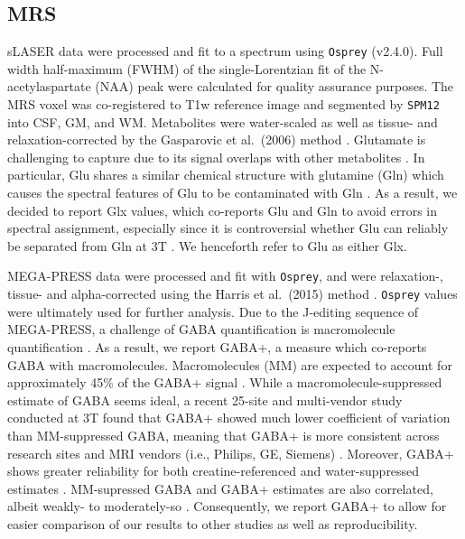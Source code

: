 \documentclass[
true
]{sn-jnl}
\begin{document}
\subsection{MRS}\label{mrs}

sLASER data were processed and fit to a spectrum using \texttt{Osprey}
\citep{oeltzschnerOspreyOpenSourceProcessing2020} (v2.4.0). Full width
half-maximum (FWHM) of the single-Lorentzian fit of the
N-acetylaspartate (NAA) peak were calculated for quality assurance
purposes. The MRS voxel was co-registered to T1w reference image and
segmented by \texttt{SPM12}
\citep{fristonStatisticalParametricMapping2007} into CSF, GM, and WM.
Metabolites were water-scaled as well as tissue- and
relaxation-corrected by the Gasparovic et al.~(2006) method
\citep{gasparovicUseTissueWater2006}. Glutamate is challenging to
capture due to its signal overlaps with other metabolites
\citep{pasantaFunctionalMRSStudies2023}. In particular, Glu shares a
similar chemical structure with glutamine (Gln) which causes the
spectral features of Glu to be contaminated with Gln
\citep{ramadanGlutamateGlutamineReview2013}. As a result, we decided to
report Glx values, which co-reports Glu and Gln to avoid errors in
spectral assignment, especially since it is controversial whether Glu
can reliably be separated from Gln at 3T
\citep{pasantaFunctionalMRSStudies2023, ramadanGlutamateGlutamineReview2013}.
We henceforth refer to Glu as either Glx.

MEGA-PRESS data were processed and fit with \texttt{Osprey}, and were
relaxation-, tissue- and alpha-corrected using the Harris et al.~(2015)
method \citep{harrisSpectralEditingMeasurementsGABA2015}.
\texttt{Osprey} values were ultimately used for further analysis. Due to
the J-editing sequence of MEGA-PRESS, a challenge of GABA quantification
is macromolecule quantification
\citep{harrisSpectralEditingMeasurementsGABA2015}. As a result, we
report GABA+, a measure which co-reports GABA with macromolecules.
Macromolecules (MM) are expected to account for approximately 45\% of
the GABA+ signal \citep{harrisSpectralEditingMeasurementsGABA2015}.
While a macromolecule-suppressed estimate of GABA seems ideal, a recent
25-site and multi-vendor study conducted at 3T found that GABA+ showed
much lower coefficient of variation than MM-suppressed GABA, meaning
that GABA+ is more consistent across research sites and MRI vendors
(i.e., Philips, GE, Siemens) \citep{mikkelsenBigGABAII2019}. Moreover,
GABA+ shows greater reliability for both creatine-referenced and
water-suppressed estimates
\citep{mikkelsenBigGABAEdited2017, mikkelsenBigGABAII2019}. MM-supressed
GABA and GABA+ estimates are also correlated, albeit weakly- to
moderately-so
\citep{harrisSpectralEditingMeasurementsGABA2015, mikkelsenBigGABAII2019, mikkelsenBigGABAEdited2017}.
Consequently, we report GABA+ to allow for easier comparison of our
results to other studies as well as reproducibility.
\end{document}

